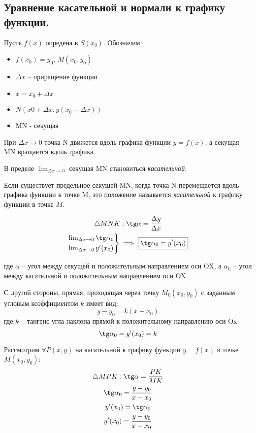 \subsection{Уравнение касательной и нормали к графику функции.}

Пусть $f(x)$ опредена в $S(x_0)$. 
Обозначим:
\begin{itemize}
  \item $f(x_0) = y_0$, $M(x_0, y_0)$
  \item $\Delta x$ -- приращение функции
  \item $x = x_0 + \Delta x$ 
  \item $N(x0 + \Delta x, y(x_0 + \Delta x))$
  \item MN - секущая
\end{itemize}

При $\Delta x \to 0$ точка N движется вдоль графика функции $y = f(x)$, а секущая MN вращается вдоль графика.

В пределе $\lim_{\Delta x \to 0}$ секущая MN становиться \textit{касательной}.

\begin{definition}
  Если существует предельное секущей MN, когда точка N перемещается вдоль графика функции к точке M, это положение называется \textit{касательной} к графику функции в точке $M$.
\end{definition}

\begin{gather*}
  \triangle MNK: \tg \alpha = \frac{\Delta y}{\Delta x} \\
  \begin{rcases}
    \lim_{\Delta x \to 0} \tg \alpha_0 \\
    \lim_{\Delta x \to 0} y'(x_0)
  \end{rcases} \implies \boxed{
    \tg \alpha_0 = y'(x_0)
  }
\end{gather*}

где $\alpha$ -- угол между секущей и положительным направлением оси OX, а
$\alpha_0$ -- угол между касательной и положительным направлением оси OX.

С другой стороны, прямая, проходящая через точку $M_0(x_0, y_0)$ с заданным угловым коэффициентом $k$ имеет вид: \[
y - y_0 = k(x - x_0)
\] 
где $k$ -- тангенс угла наклона прямой к положительному направлению оси Ox.  \[
\tg \alpha_0 = y'(x_0) = k
\] 

Рассмотрим $\forall P(x, y)$ на касательной к графику функции $y = f(x)$ в точке $M(x_0, y_0)$:
\begin{gather*}
  \triangle MPK: \tg \alpha = \frac{PK}{MK} \\
  \tg \alpha_0 = \frac{y - y_0}{x - x_0} \\
  y'(x_0) = \tg \alpha_0 \\
  y'(x_0) = \frac{y - y_0}{x - x_0}
\end{gather*}

